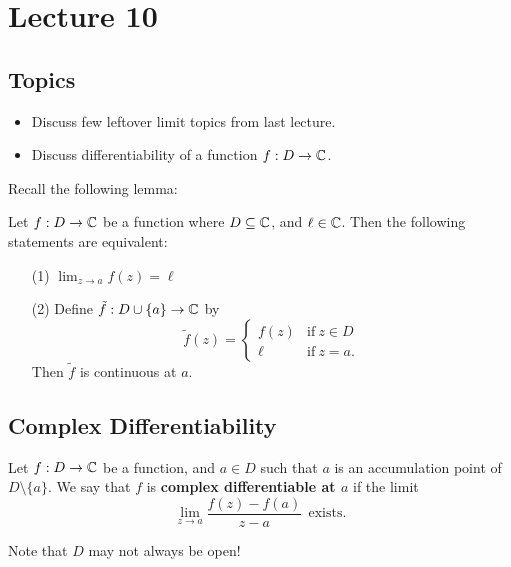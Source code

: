 \documentclass[a4paper]{report}
\begin{document}
\section{Lecture 10}

\subsection{Topics}
\begin{itemize}
    \item Discuss few leftover limit topics from last lecture.
    \item Discuss differentiability of a function \( f: D \to \mathbb{C}  \).
\end{itemize}

Recall the following lemma:

\begin{lemma}
    Let \( f: D \to \mathbb{C}  \) be a function where \( D \subseteq \mathbb{C}  \), and \( \ell \in \mathbb{C}  \). Then the following statements are equivalent:
    \begin{enumerate}
        \item[(1)] \( \lim_{ z \to a } f(z) = \ell  \)
        \item[(2)] Define \( \tilde{f} : D \cup \{ a \}  \to \mathbb{C}  \) by
            \[  \tilde{f}(z) = 
            \begin{cases}
                f(z) &\text{if} \ z \in D \\
                \ell &\text{if} \ z = a.
            \end{cases} \]
            Then \( \tilde{f} \) is continuous at \( a  \).
    \end{enumerate}
\end{lemma}

\subsection{Complex Differentiability}

\begin{definition}
    Let \( f: D \to \mathbb{C}  \) be a function, and \(a \in D  \) such that \( a  \) is an accumulation point of \( D \setminus  \{ a \}  \). We say that \( f  \) is \textbf{complex differentiable at \( a  \)} if the limit 
    \[  \lim_{ z \to a } \frac{ f(z) - f(a)  }{  z - a  } \ \ \text{exists}.  \]
\end{definition}

\begin{remark}
    Note that \( D  \) may not always be open!
\end{remark}
\end{document}

